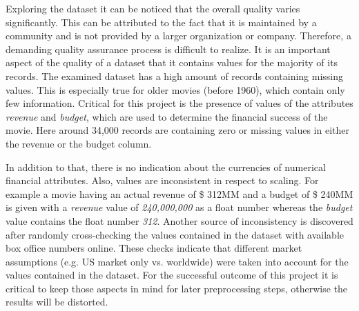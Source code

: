 Exploring the dataset it can be noticed that the overall quality varies significantly. This can be attributed to the fact that it is maintained by a community and is not provided by a larger organization or company. Therefore, a demanding quality assurance process is difficult to realize. It is an important aspect of the quality of a dataset that it contains values for the majority of its records. The examined dataset has a high amount of records containing missing values. This is especially true for older movies (before 1960), which contain only few information. Critical for this project is the presence of values of the attributes \textit{revenue} and \textit{budget}, which are used to determine the financial success of the movie. Here around 34,000 records are containing zero or missing values in either the revenue or the budget column.

In addition to that, there is no indication about the currencies of numerical financial attributes. Also, values are inconsistent in respect to scaling. For example a movie having an actual revenue of \$ 312MM and a budget of \$ 240MM is given with a \textit{revenue} value of \textit{240,000,000} as a float number whereas the \textit{budget} value contains the float number \textit{312}. Another source of inconsistency is discovered after randomly cross-checking the values contained in the dataset with available box office numbers online. These checks indicate that different market assumptions (e.g. US market only vs. worldwide) were taken into account for the values contained in the dataset. For the successful outcome of this project it is critical to keep those aspects in mind for later preprocessing steps, otherwise the results will be distorted.

